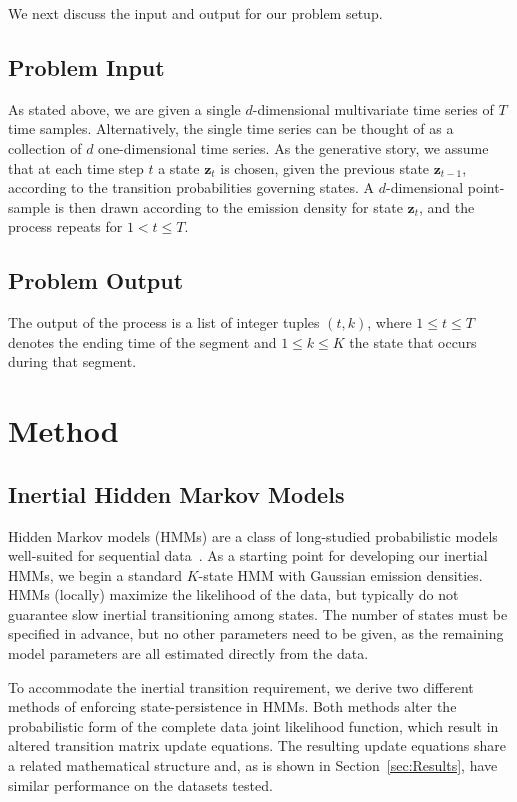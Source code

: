 \documentclass[letterpaper]{article}
\begin{document}
We next discuss the input and output for our problem setup.

\subsection{Problem Input}

As stated above, we are given a single $d$-dimensional multivariate time series of $T$ time samples. Alternatively, the single time series can be thought of as a collection of $d$ one-dimensional time series. As the generative story, we assume that at each time step $t$ a state $\mathbf{z}_t$ is chosen, given the previous state $\mathbf{z}_{t-1}$, according to the transition probabilities governing states. A $d$-dimensional point-sample is then drawn according to the emission density for state $\mathbf{z}_t$, and the process repeats for $1 < t \leq T$.

\subsection{Problem Output}

The output of the process is a list of integer tuples $(t, k)$, where $1 \leq t \leq T$ denotes the ending time of the segment and $1 \leq k \leq K$ the state that occurs during that segment. 

\section{Method}

\subsection{Inertial Hidden Markov Models}

Hidden Markov models (HMMs) are a class of long-studied probabilistic models well-suited for sequential data~\cite{rabiner1989tutorial}. As a starting point for developing our inertial HMMs, we begin a standard $K$-state HMM with Gaussian emission densities. HMMs (locally) maximize the likelihood of the data, but typically do not guarantee slow inertial transitioning among states. The number of states must be specified in advance, but no other parameters need to be given, as the remaining model parameters are all estimated directly from the data. 

To accommodate the inertial transition requirement, we derive two different methods of enforcing state-persistence in HMMs. Both methods alter the probabilistic form of the complete data joint likelihood function, which result in altered transition matrix update equations. The resulting update equations share a related mathematical structure and, as is shown in Section~\ref{sec:Results}, have similar performance on the datasets tested. 
\end{document}
